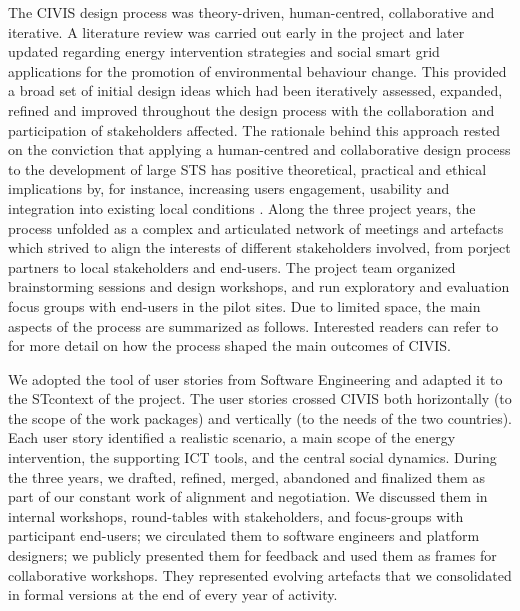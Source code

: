 The CIVIS design process was theory-driven, human-centred, collaborative and iterative. A
literature review was carried out early in the project and later updated regarding energy intervention strategies and social smart
grid applications for the promotion of environmental behaviour change. This provided a broad set
of initial design ideas which had been iteratively assessed, expanded, refined and improved throughout the design process with the collaboration and participation of stakeholders affected.
% 
The rationale behind this approach rested on the conviction that applying a human-centred and
collaborative design process to the development of large STS has positive
theoretical, practical and ethical implications \cite{Boedker2004,Greenbaum1993} by, for instance, increasing users engagement,
usability and integration into existing local conditions \cite{Brynjarsdottir2012,Dick2012,Pierce2012}.
% 
Along the three project years, the process unfolded as a complex and articulated network of meetings and artefacts
which strived to align the interests of different stakeholders involved, from porject partners to
local stakeholders and end-users. The project team organized brainstorming sessions and design workshops, and run exploratory and evaluation focus groups with end-users in the pilot sites.
Due to limited space, the main aspects of the process are summarized as follows. Interested readers can refer to
\cite{poderi_disentangling_2017} for more detail  on how the process shaped the main
outcomes of CIVIS. %


We adopted the tool of user stories \cite{Kankainen2012} from Software Engineering and adapted it to the STcontext of the project. The user stories crossed CIVIS both horizontally (to the
scope of the work packages) and vertically (to the needs of the two countries). Each user
story identified a realistic scenario, a main scope of the energy intervention, the supporting ICT tools,
and the central social dynamics. During the three years, we drafted, refined, merged, abandoned and
finalized them as part of our constant work of alignment and negotiation. We discussed them in internal
workshops, round-tables with stakeholders, and focus-groups with participant end-users; we circulated
them to software engineers and platform designers; we publicly presented them for feedback and used them
as frames for collaborative workshops. They represented evolving artefacts that we consolidated in formal
versions at the end of every year of activity. 

